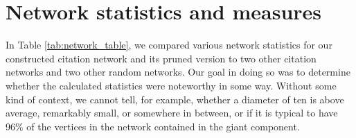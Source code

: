 \documentclass[12pt]{thesis}
\theoremstyle{plain}
\theoremstyle{definition}
\theoremstyle{remark}
\begin{document}
%







\section{Network statistics and measures}


In Table \ref{tab:network_table}, we compared various network statistics for our constructed citation network and its pruned version to two other citation networks and two other random networks. Our goal in doing so was to determine whether the calculated statistics were noteworthy in some way. Without some kind of context, we cannot tell, for example, whether a diameter of ten is above average, remarkably small, or somewhere in between, or if it is typical to have 96\% of the vertices in the network contained in the giant component. 
\end{document}
